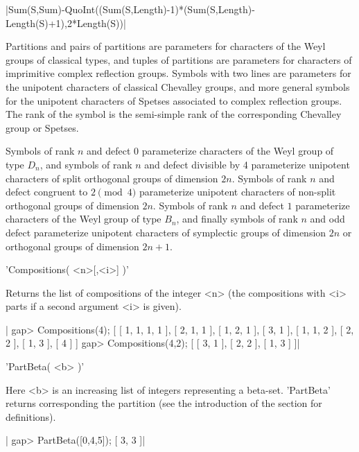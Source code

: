 |Sum(S,Sum)-QuoInt((Sum(S,Length)-1)*(Sum(S,Length)-Length(S)+1),2*Length(S))|

Partitions and pairs of partitions  are parameters for characters of the
Weyl groups of classical types,  and tuples of partitions are parameters
for characters  of imprimitive  complex reflection groups.  Symbols with
two  lines are  parameters  for the  unipotent  characters of  classical
Chevalley groups, and more general  symbols for the unipotent characters
of  Spetses associated  to complex  reflection groups.  The rank  of the
symbol is the  semi-simple rank of the corresponding  Chevalley group or
Spetses.

Symbols of rank  $n$ and defect $0$ parameterize characters  of the Weyl
group of  type $D_n$, and  symbols of rank  $n$ and defect  divisible by
4  parameterize  unipotent  characters  of split  orthogonal  groups  of
dimension $2n$. Symbols of rank $n$  and defect congruent to $2 \pmod 4$
parameterize  unipotent characters  of  non-split  orthogonal groups  of
dimension  $2n$.  Symbols  of  rank  $n$  and  defect  $1$  parameterize
characters of the Weyl group of  type $B_n$, and finally symbols of rank
$n$  and  odd defect  parameterize  unipotent  characters of  symplectic
groups of dimension $2n$ or orthogonal groups of dimension $2n+1$.

%
%

'Compositions( <n>[,<i>] )'

Returns  the list of compositions of the integer <n> (the compositions with
<i> parts if a second argument <i> is given).

|    gap> Compositions(4);
    [ [ 1, 1, 1, 1 ], [ 2, 1, 1 ], [ 1, 2, 1 ], [ 3, 1 ], [ 1, 1, 2 ],
      [ 2, 2 ], [ 1, 3 ], [ 4 ] ]
    gap> Compositions(4,2);
    [ [ 3, 1 ], [ 2, 2 ], [ 1, 3 ] ]|

%
%

'PartBeta( <b> )'

Here  <b>  is  an  increasing  list  of  integers  representing a beta-set.
'PartBeta' returns corresponding the partition (see the introduction of the
section for definitions).

|    gap> PartBeta([0,4,5]);
    [ 3, 3 ]|

%
%

